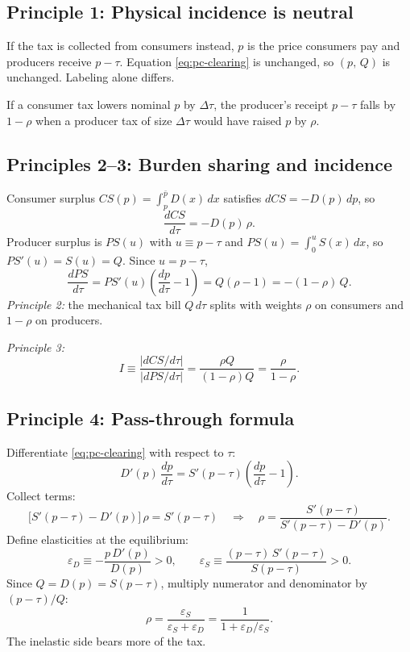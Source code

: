 \documentclass[11pt]{article}
\begin{document}
\subsection{Principle 1: Physical incidence is neutral}

If the tax is collected from consumers instead, $p$ is the price consumers
pay and producers receive $p - \tau$.  Equation \eqref{eq:pc-clearing} is
unchanged, so $(p,\,Q)$ is unchanged.  Labeling alone differs.

If a consumer tax lowers nominal $p$ by $\Delta\tau$, the producer's receipt
$p - \tau$ falls by $1 - \rho$ when a producer tax of size $\Delta\tau$ would
have raised $p$ by $\rho$.

\subsection{Principles 2--3: Burden sharing and incidence}

Consumer surplus $CS(p) = \int_p^{\bar p} D(x)\,dx$ satisfies
$dCS = -D(p)\,dp$, so
\begin{equation}
  \frac{dCS}{d\tau} = -D(p)\,\rho.
  \label{eq:pc-dcs}
\end{equation}
Producer surplus is $PS(u)$ with $u \equiv p - \tau$ and
$PS(u) = \int_0^u S(x)\,dx$, so $PS'(u) = S(u) = Q$.  Since
$u = p - \tau$,
\[
  \frac{dPS}{d\tau}
  = PS'(u)\left(\frac{dp}{d\tau} - 1\right)
  = Q(\rho - 1)
  = -(1-\rho)\,Q.
  \label{eq:pc-dps}
\]
\emph{Principle 2:} the mechanical tax bill $Q\,d\tau$ splits with weights
$\rho$ on consumers and $1-\rho$ on producers.

\emph{Principle 3:}
\[
  I \equiv \frac{|dCS/d\tau|}{|dPS/d\tau|}
  = \frac{\rho Q}{(1-\rho)Q}
  = \frac{\rho}{1-\rho}.
\]

\subsection{Principle 4: Pass-through formula}

Differentiate \eqref{eq:pc-clearing} with respect to $\tau$:
\[
  D'(p)\,\frac{dp}{d\tau}
  = S'(p-\tau)\left(\frac{dp}{d\tau} - 1\right).
\]
Collect terms:
\[
  \bigl[S'(p-\tau) - D'(p)\bigr]\,\rho = S'(p-\tau)
  \quad\Rightarrow\quad
  \rho = \frac{S'(p-\tau)}{S'(p-\tau) - D'(p)}.
\]
Define elasticities at the equilibrium:
\[
  \varepsilon_D \equiv -\frac{p\,D'(p)}{D(p)} > 0,
  \qquad
  \varepsilon_S \equiv \frac{(p-\tau)\,S'(p-\tau)}{S(p-\tau)} > 0.
\]
Since $Q = D(p) = S(p-\tau)$, multiply numerator and denominator by
$(p-\tau)/Q$:
\[
  \rho = \frac{\varepsilon_S}{\varepsilon_S + \varepsilon_D}
  = \frac{1}{1 + \varepsilon_D/\varepsilon_S}.
\]
The inelastic side bears more of the tax.
\end{document}
